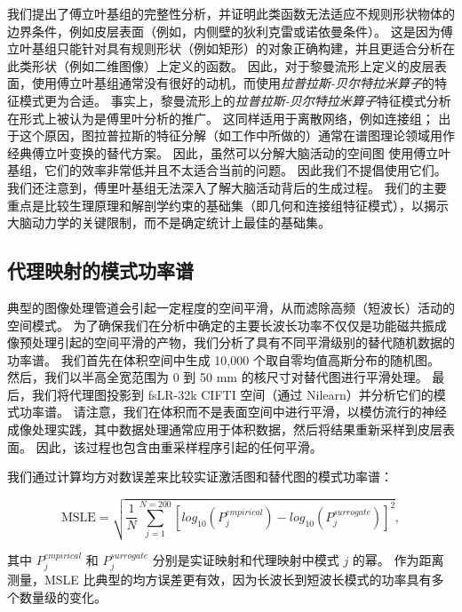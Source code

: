 \documentclass[lang=cn,a4paper,newtx,citestyle=gb7714-2015, bibstyle=gb7714-2015]{elegantpaper}
\begin{document}
我们提出了傅立叶基组的完整性分析，并证明此类函数无法适应不规则形状物体的边界条件，例如皮层表面（例如，内侧壁的狄利克雷或诺依曼条件）\cite{hasson2008hierarchy}。
这是因为傅立叶基组只能针对具有规则形状（例如矩形）的对象正确构建，并且更适合分析在此类形状（例如二维图像）上定义的函数。
因此，对于黎曼流形上定义的皮层表面，使用傅立叶基组通常没有很好的动机，而使用\textit{拉普拉斯-贝尔特拉米算子}的特征模式更为合适\cite{murray2014hierarchy,glasser2011mapping}。
事实上，黎曼流形上的\textit{拉普拉斯-贝尔特拉米算子}特征模式分析在形式上被认为是傅里叶分析\cite{gao2020neuronal}的推广。
这同样适用于离散网络，例如连接组；
出于这个原因，图拉普拉斯的特征分解（如工作中所做的）通常在谱图理论领域用作经典傅立叶变换的替代方案\cite{tian2020topographic}。
因此，虽然可以分解大脑活动的空间图 使用傅立叶基组，它们的效率非常低并且不太适合当前的问题。
因此我们不提倡使用它们。
我们还注意到，傅里叶基组无法深入了解大脑活动背后的生成过程。
我们的主要重点是比较生理原理和解剖学约束的基础集（即几何和连接组特征模式），以揭示大脑动力学的关键限制，而不是确定统计上最佳的基础集。





\subsection{代理映射的模式功率谱} \label{sec:modal_power_spectra}


典型的图像处理管道会引起一定程度的空间平滑，从而滤除高频（短波长）活动的空间模式。
为了确保我们在分析中确定的主要长波长功率不仅仅是功能磁共振成像预处理引起的空间平滑的产物，我们分析了具有不同平滑级别的替代随机数据的功率谱。
我们首先在体积空间中生成 10,000 个取自零均值高斯分布的随机图。
然后，我们以半高全宽范围为 0 到 50 mm 的核尺寸对替代图进行平滑处理。
最后，我们将代理图投影到 fsLR-32k CIFTI 空间（通过 Nilearn）并分析它们的模式功率谱。
请注意，我们在体积而不是表面空间中进行平滑，以模仿流行的神经成像处理实践，其中数据处理通常应用于体积数据，然后将结果重新采样到皮层表面\cite{haak2018connectopic}。
因此，该过程也包含由重采样程序引起的任何平滑。


我们通过计算均方对数误差来比较实证激活图和替代图的模式功率谱：

\begin{equation}\label{eq:MSLE}
	\text{MSLE} = \sqrt{
				\frac{1}{N}
					\sum_{j=1}^{N=200}
					[ log_10 (P_j^{empirical}) - 
					log_10 (P_j^{surrogate}) ] ^2
				},
\end{equation}

其中 $ P_j^{empirical} $ 和 $ P_j^{surrogate} $ 分别是实证映射和代理映射中模式 $ j $ 的幂。
作为距离测量，MSLE 比典型的均方误差更有效，因为长波长到短波长模式的功率具有多个数量级的变化。
\end{document}

